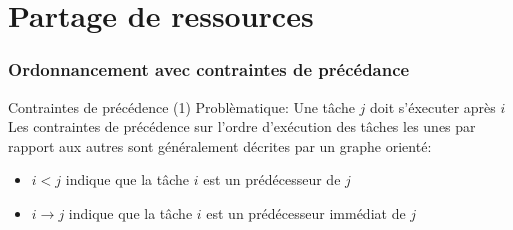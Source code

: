 %
%
%

\part{Partage de ressources}

\begin{frame}
  \partpage
\end{frame}

\begin{frame}
  \tableofcontents[currentpart]
\end{frame}

\section{Ordonnancement avec contraintes de précédance}

\begin{frame}{Contraintes de précédence (1)}
  Problèmatique: Une tâche $j$ doit s'éxecuter après $i$\\

  Les contraintes de précédence sur l'ordre d'exécution des tâches les
  unes par rapport aux autres sont généralement décrites par un graphe
  orienté:
  \begin{itemize}
  \item $i < j$ indique que  la tâche $i$ est un prédécesseur de
    $j$
  \item $i  → j$  indique que la  tâche $i$ est  un prédécesseur
    immédiat de $j$
  \end{itemize}
  \begin{center}
    
  \end{center}
\end{frame}

